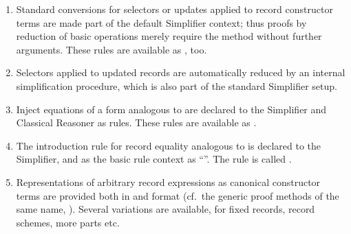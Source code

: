 \begin{isabellebody}
\begin{isamarkuptext}
  \begin{enumerate}
  
  \item Standard conversions for selectors or updates applied to
  record constructor terms are made part of the default Simplifier
  context; thus proofs by reduction of basic operations merely require
  the \hyperlink{method.simp}{\mbox{}} method without further arguments.  These rules
  are available as , too.
  
  \item Selectors applied to updated records are automatically reduced
  by an internal simplification procedure, which is also part of the
  standard Simplifier setup.

  \item Inject equations of a form analogous to  are declared to the Simplifier and Classical
  Reasoner as \hyperlink{attribute.iff}{\mbox{}} rules.  These rules are available as
  .

  \item The introduction rule for record equality analogous to  is declared to the Simplifier,
  and as the basic rule context as ``\hyperlink{attribute.intro}{\mbox{}}\isa{{\isachardoublequote}{\isacharquery}{\isachardoublequote}}''.
  The rule is called .

  \item Representations of arbitrary record expressions as canonical
  constructor terms are provided both in \hyperlink{method.cases}{\mbox{}} and \hyperlink{method.induct}{\mbox{}} format (cf.\ the generic proof methods of the same name,
  ).  Several variations are available, for
  fixed records, record schemes, more parts etc.
  

\end{enumerate}
\end{isamarkuptext}
\end{isabellebody}
